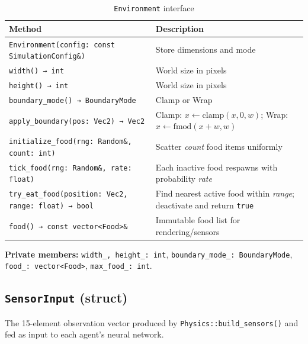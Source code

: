 \begin{table}[H]
\centering\small
\caption{\texttt{Environment} interface}
\begin{tabularx}{\textwidth}{@{}lX@{}}
\toprule
\textbf{Method} & \textbf{Description} \\
\midrule
\texttt{Environment(config: const SimulationConfig\&)} & Store dimensions and mode \\
\texttt{width() → int} & World size in pixels \\
\texttt{height() → int} & World size in pixels \\
\texttt{boundary\_mode() → BoundaryMode} & Clamp or Wrap \\
\texttt{apply\_boundary(pos: Vec2) → Vec2} &
  Clamp: $x \leftarrow \text{clamp}(x, 0, w)$;
  Wrap: $x \leftarrow \text{fmod}(x+w, w)$ \\
\texttt{initialize\_food(rng: Random\&, count: int)} & Scatter \emph{count} food items uniformly \\
\texttt{tick\_food(rng: Random\&, rate: float)} & Each inactive food respawns with probability \emph{rate} \\
\texttt{try\_eat\_food(position: Vec2, range: float) → bool} & Find nearest active food within \emph{range}; deactivate and return \texttt{true} \\
\texttt{food() → const vector<Food>\&} & Immutable food list for rendering/sensors \\
\bottomrule
\end{tabularx}
\end{table}

\textbf{Private members:} \texttt{width\_, height\_: int}, \texttt{boundary\_mode\_: BoundaryMode},
\texttt{food\_: vector<Food>}, \texttt{max\_food\_: int}.

\subsection{\texttt{SensorInput} (struct)}

The 15-element observation vector produced by \texttt{Physics::build\_sensors()} and fed
as input to each agent's neural network.

